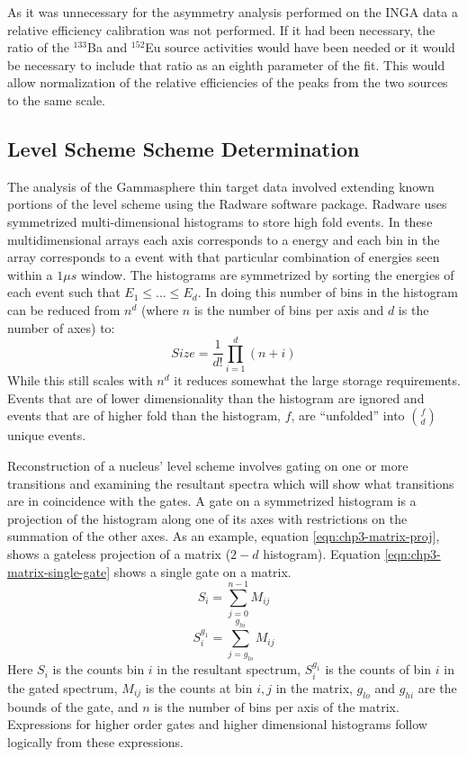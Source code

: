 As it was unnecessary for the asymmetry analysis performed on the INGA data a relative efficiency calibration was not performed. If it had been necessary, the ratio of the $^{133}$Ba and $^{152}$Eu source activities would have been needed or it would be necessary to include that ratio as an eighth parameter of the fit. This would allow normalization of the relative efficiencies of the peaks from the two sources to the same scale.

\subsection{Level Scheme Scheme Determination}
\label{ssec:exp-pr-data-proc-lvl-scheme}
The analysis of the Gammasphere thin target data involved extending known portions of the level scheme using the Radware software package\cite{radware}. Radware uses symmetrized multi-dimensional histograms to store high fold events. In these multidimensional arrays each axis corresponds to a \gr{} energy and each bin in the array corresponds to a event with that particular combination of \gr{} energies seen within a $1\mu{}s$ window. The histograms are symmetrized by sorting the \gr{} energies of each event such that $E_1\leq{}...\leq{}E_d$. In doing this number of bins in the histogram can be reduced from $n^d$ (where $n$ is the number of bins per axis and $d$ is the number of axes) to:
\begin{equation}
\label{eqn:chp3-hist-size}
Size=\frac{1}{d!}\prod\limits_{i=1}^{d}(n+i)
\end{equation}
While this still scales with $n^d$ it reduces somewhat the large storage requirements. Events that are of lower dimensionality than the histogram are ignored and events that are of higher fold than the histogram, $f$, are ``unfolded'' into $f \choose d$ unique events.

Reconstruction of a nucleus' level scheme involves gating on one or more transitions and examining the resultant spectra which will show what transitions are in coincidence with the gates. A gate on a symmetrized histogram is a projection of the histogram along one of its axes with restrictions on the summation of the other axes. As an example, equation \ref{eqn:chp3-matrix-proj}, shows a gateless projection of a matrix ($2-d$ histogram). Equation \ref{eqn:chp3-matrix-single-gate} shows a single gate on a matrix.
\begin{equation}
\label{eqn:chp3-matrix-proj}
S_i = \sum\limits_{j=0}^{n-1}M_{ij}
\end{equation}
\begin{equation}
\label{eqn:chp3-matrix-single-gate}
S^{g_1}_i = \sum\limits_{j=g_{lo}}^{g_{hi}}M_{ij}
\end{equation}
Here $S_i$ is the counts bin $i$ in the resultant spectrum, $S^{g_1}_i$ is the counts of bin $i$ in the gated spectrum, $M_{ij}$ is the counts at bin $i,j$ in the matrix, $g_{lo}$ and $g_{hi}$ are the bounds of the gate, and $n$ is the number of bins per axis of the matrix. Expressions for higher order gates and higher dimensional histograms follow logically from these expressions.

